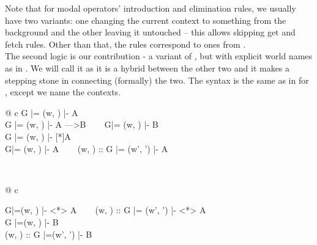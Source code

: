 Note that for modal operators' introduction and elimination rules, we usually have two variants: one changing the current context to something from the background and the other leaving it untouched -- this allows skipping get and fetch rules. Other than that, the rules correspond to ones from \langL{}.\\

The second logic is our contribution - a variant of \logicLF{}, but with explicit world names as in \logicL{}. We will call it \logicHyb{} as it is a hybrid between the other two and it makes a stepping stone in connecting (formally) the two. The syntax is the same as in \ND{} for \logicLF{}, except we name the contexts.\\

\textbf{\logicHyb{}}
\begin{center}
\footnotesize
\begin{spacing}{2.5}
\begin{tabular}{@{} c }
			{G |= (w, \Gamma) |- A} \\

			    {G |= (w, \Gamma) |- A --->B} ~~~
			     {G|= (w, \Gamma) |- B}\\

			     {G |= (w, \Gamma) |- [*]A} \\

				 {G|= (w, \Gamma) |- A} ~~~
			      {(w, \Gamma) :: G |= (w', \Gamma') |- A}\\
\end{tabular}\\
\begin{tabular}{@{} c }

			     {G|=(w, \Gamma) |- <*> A} ~~~
			     {(w, \Gamma) :: G |= (w', \Gamma') |- <*> A}\\

	{G |=(w, \Gamma) |- B}\\

	{(w, \Gamma) :: G |=(w', \Gamma') |- B}
\end{tabular}\\
\end{spacing}
\normalsize
\end{center}

